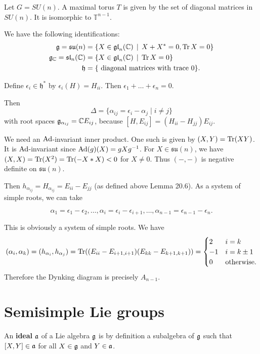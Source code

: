 \documentclass[11pt, english]{article}
\begin{document}
\begin{example}
Let $G = SU(n)$. A maximal torus $T$ is given by the set of diagonal matrices in $SU(n)$. It is isomorphic to $\mathbb T^{n-1}$.

We have the following identifications:
\begin{align*}
  \mathfrak g = \mathfrak{su}(n) &= \{ X \in \mathfrak{gl}_n(\mathbb{C}) \, \mid \, X + X^\ast = 0, \operatorname{Tr} X = 0 \} \\
\mathfrak g_{\mathbb{C}} = \mathfrak{sl}_n(\mathbb{C}) &= \{ X \in \mathfrak{gl}_n(\mathbb{C}) \, \mid \, \operatorname{Tr} X = 0 \} \\
\mathfrak h &=  \{ \text{ diagonal matrices with trace } 0 \}.
\end{align*}

Define $\epsilon_i \in \mathfrak h^\ast$ by $\epsilon_i(H)=H_{ii}$. Then $\epsilon_1+\ldots+\epsilon_n = 0$.

Then
$$
\Delta = \{ \alpha_{ij} = \epsilon_i-\alpha_j \mid i \neq j \}
$$
with root spaces $\mathfrak g_{\alpha_{ij}} = \mathbb{C} E_{ij}$, because $[H,E_{ij}] = (H_{ii}-H_{jj})E_{ij}$. 

We need an $\operatorname{Ad}$-invariant inner product. One such is given by $(X,Y) =  \operatorname{Tr}(XY)$. It is $\operatorname{Ad}$-invariant since $\operatorname{Ad}(g)(X) = gXg^{-1}$. For $X \in \mathfrak{su}(n)$, we have $(X,X) = \operatorname{Tr}(X^2)= \operatorname{Tr}(-X\ast X ) < 0$ for $X \neq 0$. Thus $(-,-)$ is negative definite on $\mathfrak{su}(n)$. 

Then $h_{\alpha_{ij}}=H_{\alpha_{ij}}=E_{ii}-E_{jj}$ (as defined above Lemma 20.6). As a system of simple roots, we can take 

$$
\alpha_1 = \epsilon_1-\epsilon_2, \ldots, \alpha_i = \epsilon_i-\epsilon_{i+1}, \ldots, \alpha_{n-1}=\epsilon_{n-1}-\epsilon_n.
$$

This is obviously a system of simple roots. We have
$$
(\alpha_i,\alpha_k) = (h_{\alpha_i}, h_{\alpha_j}) = \operatorname{Tr}( (E_{ii}-E_{i+1,i+1})(E_{kk}-E_{k+1,k+1})) = \begin{cases}
2 & i=k \\
-1 & i=k \pm 1 \\
0 & \text{otherwise}.
\end{cases}
$$
Therefore the Dynking diagram is precisely $A_{n-1}$.
\end{example}


\newpage
\section{Semisimple Lie groups}

An \textbf{ideal} $\mathfrak{a}$ of a Lie algebra $\mathfrak g$ is by definition a subalgebra of $\mathfrak g$ such that $[X,Y] \in \mathfrak{a}$ for all $X \in \mathfrak g$ and $Y \in \mathfrak{a}$. 
\end{document}
